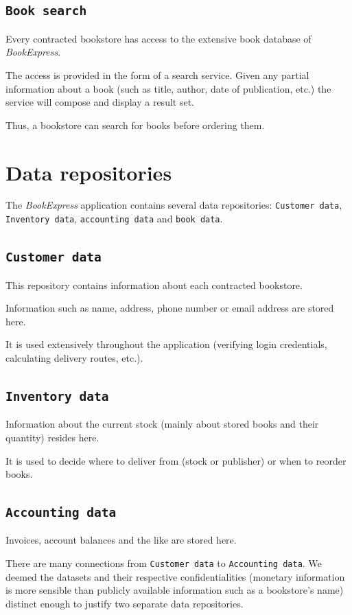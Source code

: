 \section{\texttt{Book search}}
Every contracted bookstore has access to the extensive book database of \emph{BookExpress}.

The access is provided in the form of a search service. Given any partial information about a book (such as title, author, date of publication, etc.)
the service will compose and display a result set.

Thus, a bookstore can search for books before ordering them.



\chapter{Data repositories}
The \emph{BookExpress} application contains several data repositories: \texttt{Customer data}, \texttt{Inventory data}, \texttt{accounting data} and \texttt{book data}.


\section{\texttt{Customer data}}
This repository contains information about each contracted bookstore.

Information such as name, address, phone number or email address are stored here.

It is used extensively throughout the application (verifying login credentials, calculating delivery routes, etc.).


\section{\texttt{Inventory data}}
Information about the current stock (mainly about stored books and their quantity) resides here.

It is used to decide where to deliver from (stock or publisher) or when to reorder books.


\section{\texttt{Accounting data}}
Invoices, account balances and the like are stored here.

There are many connections from \texttt{Customer data} to \texttt{Accounting data}. We deemed the datasets and their respective confidentialities (monetary
information is more sensible than publicly available information such as a bookstore's name) distinct enough to justify two separate data repositories.


